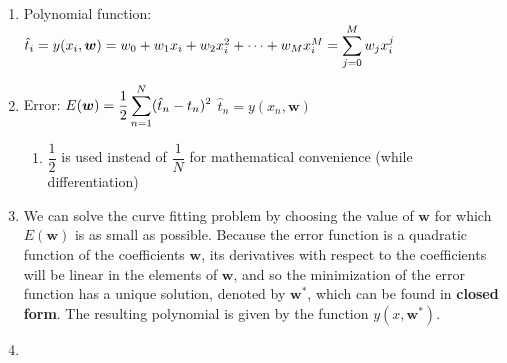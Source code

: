 \begin{enumerate}
    \item Polynomial function:
    $
        \hat{t}_i 
        = y(x_i, \bm{w}) 
        = w_0 + w_1x_i + w_2x_i^2 + \cdots + w_M x_i^M 
        = \displaystyle\sum ^M _{j=0} w_j x_i^j
    $
    \hfill \cite{ml/book/Pattern-Recognition-And-Machine-Learning/Christopher-M-Bishop}

    \item Error: 
    $
        E(\bm{w}) 
        = \dfrac{1}{2} \displaystyle\sum_{n=1}^N (\hat{t}_n - t_n)^2
    $
    \hfill
    $
        \hat{t}_n = y(x_n, \bm{w})
    $
    \hfill \cite{ml/book/Pattern-Recognition-And-Machine-Learning/Christopher-M-Bishop}
    \begin{enumerate}
        \item $\dfrac{1}{2}$ is used instead of $\dfrac{1}{N}$ for mathematical convenience (while differentiation)
    \end{enumerate}

    \item We can solve the curve fitting problem by choosing the value of $\bm{w}$ for which $E(\bm{w})$ is as small as possible. 
    Because the error function is a quadratic function of the coefficients $\bm{w}$, its derivatives with respect to the coefficients will be linear in the elements of $\bm{w}$, and so the minimization of the error function has a unique solution, denoted by $\bm{w}^\ast$, which can be found in \textbf{closed form}. 
    The resulting polynomial is given by the function $y(x, \bm{w}^\ast)$.
    \hfill \cite{ml/book/Pattern-Recognition-And-Machine-Learning/Christopher-M-Bishop}

    \item 
    \hfill \cite{ml/book/Pattern-Recognition-And-Machine-Learning/Christopher-M-Bishop}
\end{enumerate}















